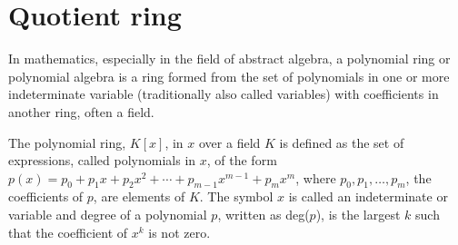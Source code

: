 \section{Quotient ring  }
In mathematics, especially in the field of abstract algebra, a polynomial ring or polynomial algebra is a ring formed from the set of polynomials in one or more indeterminate variable (traditionally also called variables) with coefficients in another ring, often a field.





\begin{definition}
\normalfont
The polynomial ring, $K[x]$, in $x$ over a field $K$ is defined as the set of expressions, called polynomials in $x$, of the form $p(x)=p_{0}+p_{1}x+p_{2}x^{2}+\cdots +p_{m-1}x^{m-1}+p_{m}x^{m}$,
where $p_{0}, p_{1}, \dots, p_{m}$, the coefficients of $p$, are elements of $K$. The symbol $x$ is called an indeterminate or variable and degree of a polynomial $p$, written as deg($p$), is the largest $k$ such that the coefficient of $x^{k}$ is not zero.
\end{definition}





